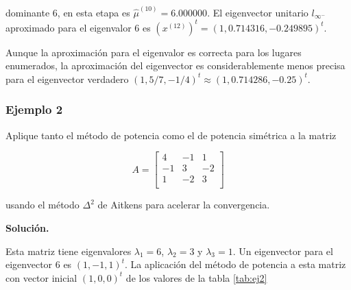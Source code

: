 \documentclass{report}
\numberwithin{subsection}{section} %
\begin{document}
    dominante 6, en esta etapa es $\hat{\mu}^{(10)} = 6.000000$. El eigenvector unitario $l_{\infty^-}$ aproximado para el eigenvalor 6 es $(x^{(12)})^t = (1, 0.714316,-0.249895)^t.$
    
    Aunque la aproximación para el eigenvalor es correcta para los lugares enumerados, la aproximación del eigenvector es considerablemente menos precisa para el eigenvector verdadero $(1, 5/7, -1/4)^t  \approx (1, 0.714286, -0.25)^t.$
        
\subsubsection*{Ejemplo 2} %
        
    Aplique tanto el método de potencia como el de potencia simétrica a la matriz

    $$A =\begin{bmatrix}
        4 & -1 & 1 \\
        -1 & 3 & -2 \\
        1 & -2 & 3 \\
    \end{bmatrix}$$

    usando el método $\Delta^2$ de Aitkens para acelerar la convergencia.

    {\bf Solución.}

    Esta matriz tiene eigenvalores $\lambda_1 = 6$, $\lambda_2 = 3$ y $\lambda_3 = 1$. Un eigenvector para el eigenvector 6 es $(1,-1, 1)^t$. La aplicación del método de potencia a esta matriz con vector inicial $(1, 0, 0)^t$ de los valores de la tabla \ref{tab:ej2}
\end{document}
